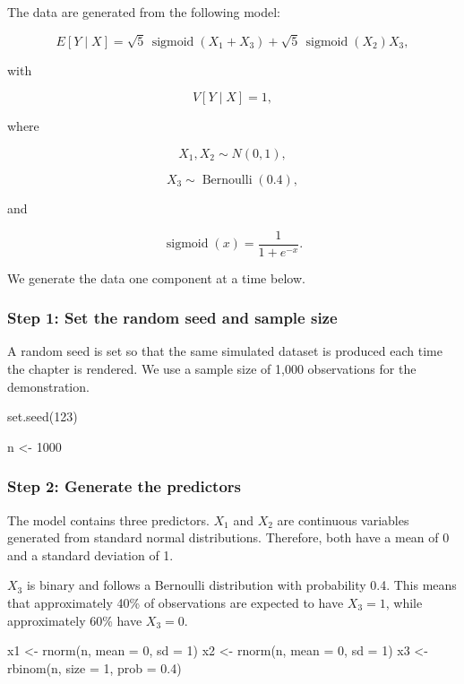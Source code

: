 \documentclass[
  letterpaper,
  DIV=11,
  numbers=noendperiod]{scrreprt}
\newenvironment{Shaded}{\begin{snugshade}}{\end{snugshade}}
\newcommand{\AttributeTok}[1]{\textcolor[rgb]{0.40,0.45,0.13}{#1}}
\newcommand{\DecValTok}[1]{\textcolor[rgb]{0.68,0.00,0.00}{#1}}
\newcommand{\FloatTok}[1]{\textcolor[rgb]{0.68,0.00,0.00}{#1}}
\newcommand{\FunctionTok}[1]{\textcolor[rgb]{0.28,0.35,0.67}{#1}}
\newcommand{\NormalTok}[1]{\textcolor[rgb]{0.00,0.23,0.31}{#1}}
\newcommand{\OtherTok}[1]{\textcolor[rgb]{0.00,0.23,0.31}{#1}}
\begin{document}
The data are generated from the following model:

\[
E[Y \mid X]
=
\sqrt{5}\,\operatorname{sigmoid}(X_1 + X_3)
+
\sqrt{5}\,\operatorname{sigmoid}(X_2)X_3,
\]

with

\[
V[Y \mid X] = 1,
\]

where

\[
X_1, X_2 \sim N(0,1),
\]

\[
X_3 \sim \operatorname{Bernoulli}(0.4),
\]

and

\[
\operatorname{sigmoid}(x)
=
\frac{1}{1+e^{-x}}.
\]

We generate the data one component at a time below.

\subsubsection{Step 1: Set the random seed and sample
size}\label{step-1-set-the-random-seed-and-sample-size}

A random seed is set so that the same simulated dataset is produced each
time the chapter is rendered. We use a sample size of 1,000 observations
for the demonstration.

\begin{Shaded}
\begin{Highlighting}[]
\FunctionTok{set.seed}\NormalTok{(}\DecValTok{123}\NormalTok{)}

\NormalTok{n }\OtherTok{\textless{}{-}} \DecValTok{1000}
\end{Highlighting}
\end{Shaded}

\subsubsection{Step 2: Generate the
predictors}\label{step-2-generate-the-predictors}

The model contains three predictors. \(X_1\) and \(X_2\) are continuous
variables generated from standard normal distributions. Therefore, both
have a mean of 0 and a standard deviation of 1.

\(X_3\) is binary and follows a Bernoulli distribution with probability
0.4. This means that approximately 40\% of observations are expected to
have \(X_3 = 1\), while approximately 60\% have \(X_3 = 0\).

\begin{Shaded}
\begin{Highlighting}[]
\NormalTok{x1 }\OtherTok{\textless{}{-}} \FunctionTok{rnorm}\NormalTok{(n, }\AttributeTok{mean =} \DecValTok{0}\NormalTok{, }\AttributeTok{sd =} \DecValTok{1}\NormalTok{)}
\NormalTok{x2 }\OtherTok{\textless{}{-}} \FunctionTok{rnorm}\NormalTok{(n, }\AttributeTok{mean =} \DecValTok{0}\NormalTok{, }\AttributeTok{sd =} \DecValTok{1}\NormalTok{)}
\NormalTok{x3 }\OtherTok{\textless{}{-}} \FunctionTok{rbinom}\NormalTok{(n, }\AttributeTok{size =} \DecValTok{1}\NormalTok{, }\AttributeTok{prob =} \FloatTok{0.4}\NormalTok{)}
\end{Highlighting}
\end{Shaded}
\end{document}
